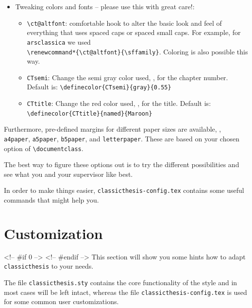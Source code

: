 \begin{itemize}
    \item Tweaking colors and fonts -- please use this with great care!:
        \begin{itemize}
            \item\verb|\ct@altfont|: comfortable hook to alter the basic look and feel of everything that uses spaced caps or spaced small caps. For example, for \texttt{arsclassica} we used \\ \verb|\renewcommand*{\ct@altfont}{\sffamily}|. Coloring is also possible this way.


            \item\texttt{CTsemi}: Change the semi gray color used, \eg, for the chapter number. Default is: \verb|\definecolor{CTsemi}{gray}{0.55}|

            \item\texttt{CTtitle}: Change the red color used, \eg, for the title. Default is: \verb|\definecolor{CTtitle}{named}{Maroon}|

        \end{itemize}

\end{itemize}

Furthermore, pre-defined margins for different paper sizes are available, \eg, \texttt{a4paper}, \texttt{a5paper}, \texttt{b5paper}, and \texttt{letterpaper}. These are based on your chosen option of \verb|\documentclass|.

The best way to figure these options out is to try the different
possibilities and see what you and your supervisor like best.

In order to make things easier, \texttt{classicthesis-config.tex}
contains some useful commands that might help you.


\section{Customization}\label{sec:custom}
<!-- #if 0 -->
<!-- #endif -->
This section will show you some hints how to adapt
\texttt{classicthesis} to your needs.

The file \texttt{classicthesis.sty}
contains the core functionality of the style and in most cases will
be left intact, whereas the file \texttt{classic\-thesis-config.tex}
is used for some common user customizations.

